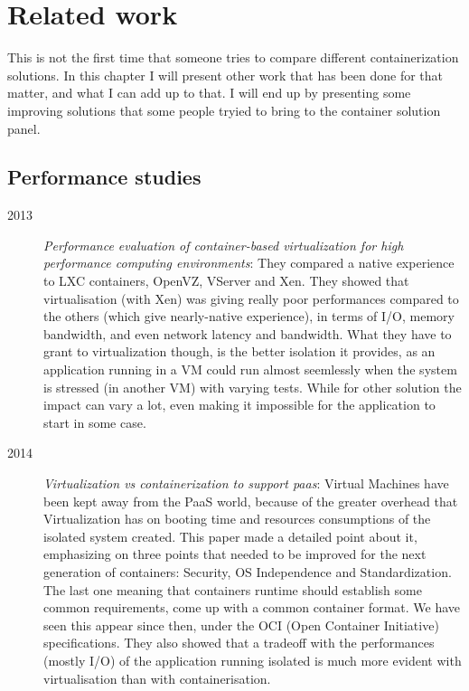 \chapter{Related work}

This is not the first time that someone tries to compare different containerization solutions.  In this chapter I will present other work that has been done for that matter, and what I can add up to that.  I will end up by presenting some improving solutions that some people tryied to bring to the container solution panel.

\section{Performance studies}

\begin{description}
  \item[2013]\textit{Performance evaluation of container-based virtualization for high performance computing environments}\cite{xavier2013performance}: They compared a native experience to LXC containers, OpenVZ, VServer and Xen.  They showed that virtualisation (with Xen) was giving really poor performances compared to the others (which give nearly-native experience), in terms of I/O, memory bandwidth, and even network latency and bandwidth.  What they have to grant to virtualization though, is the better isolation it provides, as an application running in a VM could run almost seemlessly when the system is stressed (in another VM) with varying tests.  While for other solution the impact can vary a lot, even making it impossible for the application to start in some case.
  
  \item[2014] \textit{Virtualization vs containerization to support paas}\cite{dua2014virtualization}: Virtual Machines have been kept away from the PaaS world, because of the greater overhead that Virtualization has on booting time and resources consumptions of the isolated system created.  This paper made a detailed point about it, emphasizing on three points that needed to be improved for the next generation of containers: Security, OS Independence and Standardization.  The last one meaning that containers runtime should establish some common requirements, come up with a common container format.  We have seen this appear since then, under the OCI (Open Container Initiative) specifications.  They also showed that a tradeoff with the performances (mostly I/O) of the application running isolated is much more evident with virtualisation than with containerisation.
  

\end{description}
